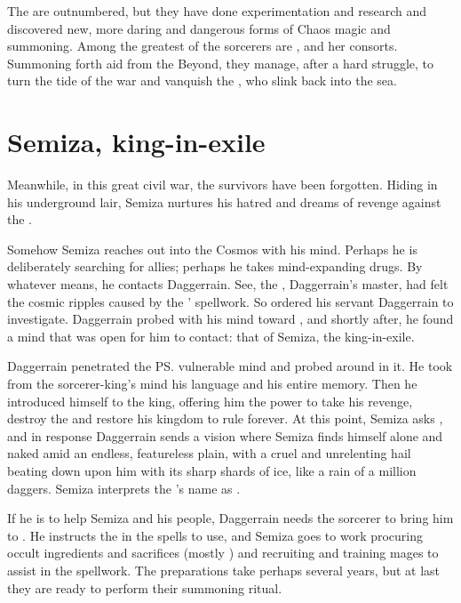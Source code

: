 The \dragons{} are outnumbered, but they have done experimentation and research and discovered new, more daring and dangerous forms of Chaos magic and \daemon{} summoning. Among the greatest of the \draconic{} sorcerers are \HesodN, \TyarithXserasshana{} and her consorts. Summoning forth \daemonic{} aid from the Beyond, they manage, after a hard struggle, to turn the tide of the war and vanquish the \leviathans{}, who slink back into the sea. 







\section{Semiza, king-in-exile}
Meanwhile, in this great civil war, the \nephil{} survivors have been forgotten. Hiding in his underground lair, Semiza nurtures his hatred and dreams of revenge against the \dragons{}. 

Somehow Semiza reaches out into the Cosmos with his mind. Perhaps he is deliberately searching for allies; perhaps he takes mind-expanding drugs. By whatever means, he contacts Daggerrain. See, the \baneking{} \Voidbringer, Daggerrain's master, had felt the cosmic ripples caused by the \dragons{}' spellwork. 
So \Voidbringer{} ordered his servant Daggerrain to investigate. Daggerrain probed with his mind toward \Miith{}, and shortly after, he found a \Miithian{} mind that was open for him to contact: that of Semiza, the \nephil{} king-in-exile. 

Daggerrain penetrated the \ps{\nephil} vulnerable mind and probed around in it. He took from the sorcerer-king's mind his language and his entire memory. Then he introduced himself to the \nephil{} king, offering him the power to take his revenge, destroy the \dragons{} and restore his kingdom to rule forever. At this point, Semiza asks , and in response Daggerrain sends a vision where Semiza finds himself alone and naked amid an endless, featureless plain, with a cruel and unrelenting hail beating down upon him with its sharp shards of ice, like a rain of a million daggers. Semiza interprets the \banelord{}'s name as . 

If he is to help Semiza and his people, Daggerrain needs the \nephil{} sorcerer to bring him to \Miith{}. He instructs the \nephil{} in the spells to use, and Semiza goes to work procuring occult ingredients and sacrifices (mostly \scathae) and recruiting and training mages to assist in the spellwork. The preparations take perhaps several years, but at last they are ready to perform their summoning ritual. 







